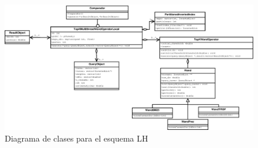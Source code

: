 \begin{figure}
\centering
\includegraphics[scale=.75]{images/TopKMultiThreadWandOperatorLocal.eps}
\caption{Diagrama de clases para el esquema LH}
\label{fig:TopKMultiThreadWandOperatorLocal}
\end{figure}

